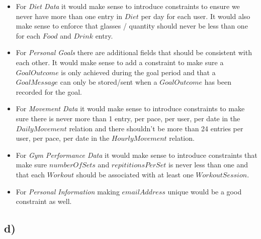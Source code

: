 \documentclass{article}
\begin{document}
\begin{itemize}
  \item For {\em Diet Data} it would make sense to introduce constraints to ensure we never have more than one entry in $Diet$ per day for each user. It would also make sense to enforce that glasses / quantity should never be less than one for each $Food$ and $Drink$ entry.
  \item For {\em Personal Goals} there are additional fields that should be consistent with each other. It would make sense to add a constraint to make sure a $GoalOutcome$ is only achieved during the goal period and that a $GoalMessage$ can only be stored/sent when a $GoalOutcome$ has been recorded for the goal.
  \item For {\em Movement Data} it would make sense to introduce constraints to make sure there is never more than 1 entry, per pace, per user, per date in the $DailyMovement$ relation and there shouldn't be more than 24 entries per user, per pace, per date in the $HourlyMovement$ relation. 
  \item For {\em Gym Performance Data} it would make sense to introduce constraints that make sure $numberOfSets$ and $repititionsPerSet$ is never less than one and that each $Workout$ should be associated with at least one $WorkoutSession$.
  \item For {\em Personal Information} making $emailAddress$ unique would be a good constraint as well.
\end{itemize}

\subsection*{\small d)}
\end{document}
